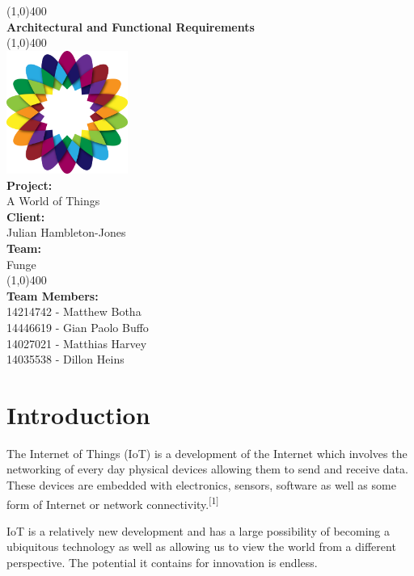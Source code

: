 \documentclass{article}
\begin{document}
\begin{titlepage}
	\begin{center}
		\line(1,0){400}\\
		[6mm]
		\huge{\bfseries Architectural and Functional Requirements}\\
		\line(1,0){400}\\
			[5mm]
			\includegraphics[width=150px]{images/AWorldOfPlants.png}
			\\
		[5mm]
		\large\textbf{Project:}\\A World of Things\\
		[3mm]
		\large\textbf{Client:}\\Julian Hambleton-Jones\\
		[3mm]
		\large \textbf{Team:}\\Funge\\
		\line(1,0){400}\\
		[5mm]
		\large \textbf{Team Members:}\\
		[3mm]
		\large 14214742 - Matthew Botha\\
		\large 14446619 - Gian Paolo Buffo\\
		\large 14027021 - Matthias Harvey\\
        \large 14035538 - Dillon Heins\\[3mm]
	\end{center}
\end{titlepage}

\cleardoublepage
\thispagestyle{empty}
\tableofcontents
\cleardoublepage

\setcounter{page}{1}

\section{Introduction}
	The Internet of Things (IoT) is a development of the Internet which involves the networking of every day physical devices allowing them to send and receive data. These devices are embedded with electronics, sensors, software as well as some form of Internet or network connectivity.\textsuperscript{[1]}

	IoT is a relatively new development and has a large possibility of becoming a ubiquitous technology as well as allowing us to view the world from a different perspective. The potential it contains for innovation is endless.
\end{document}
